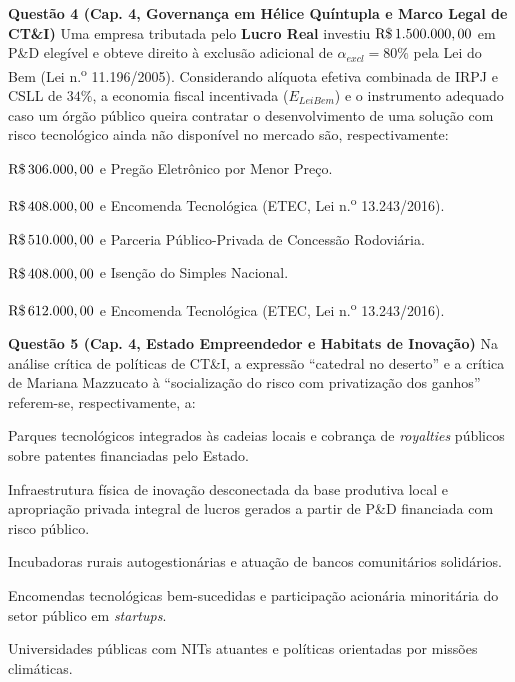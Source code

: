 \textbf{Questão 4 (Cap. 4, Governança em Hélice Quíntupla e Marco Legal de CT\&I)}
Uma empresa tributada pelo \textbf{Lucro Real} investiu $\text{R\$\,}{1.500.000,00}$ em P\&D elegível e obteve direito à exclusão adicional de $\alpha_{excl} = 80\%$ pela Lei do Bem (Lei n.\textsuperscript{o} 11.196/2005). Considerando alíquota efetiva combinada de IRPJ e CSLL de $34\%$, a economia fiscal incentivada ($E_{LeiBem}$) e o instrumento adequado caso um órgão público queira contratar o desenvolvimento de uma solução com risco tecnológico ainda não disponível no mercado são, respectivamente:
\begin{alternativas}
  \item $\text{R\$\,}{306.000,00}$ e Pregão Eletrônico por Menor Preço.
  \item $\text{R\$\,}{408.000,00}$ e Encomenda Tecnológica (ETEC, Lei n.\textsuperscript{o} 13.243/2016).
  \item $\text{R\$\,}{510.000,00}$ e Parceria Público-Privada de Concessão Rodoviária.
  \item $\text{R\$\,}{408.000,00}$ e Isenção do Simples Nacional.
  \item $\text{R\$\,}{612.000,00}$ e Encomenda Tecnológica (ETEC, Lei n.\textsuperscript{o} 13.243/2016).
\end{alternativas}

\textbf{Questão 5 (Cap. 4, Estado Empreendedor e Habitats de Inovação)}
Na análise crítica de políticas de CT\&I, a expressão ``catedral no deserto'' e a crítica de Mariana Mazzucato à ``socialização do risco com privatização dos ganhos'' referem-se, respectivamente, a:
\begin{alternativas}
  \item Parques tecnológicos integrados às cadeias locais e cobrança de \textit{royalties} públicos sobre patentes financiadas pelo Estado.
  \item Infraestrutura física de inovação desconectada da base produtiva local e apropriação privada integral de lucros gerados a partir de P\&D financiada com risco público.
  \item Incubadoras rurais autogestionárias e atuação de bancos comunitários solidários.
  \item Encomendas tecnológicas bem-sucedidas e participação acionária minoritária do setor público em \textit{startups}.
  \item Universidades públicas com NITs atuantes e políticas orientadas por missões climáticas.
\end{alternativas}

